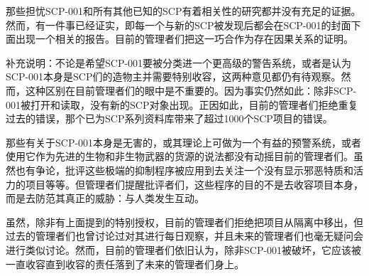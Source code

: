 那些担忧SCP-001和所有其他已知的SCP有着相关性的研究都并没有充足的证据。然而，有一件事已经证实，即每一个与新的SCP被发现后都会在SCP-001的封面下面出现一个相关的报告。目前的管理者们把这一巧合作为存在因果关系的证明。

补充说明：不论是希望SCP-001要被分类进一个更高级的警告系统，或者是认为SCP-001本身是SCP们的造物主并需要特别收容，这两种意见都仍有待观察。然而，这种区别在目前管理者们的眼中是不重要的。因为事实仍然如此：除非SCP-001被打开和读取，没有新的SCP对象出现。正因如此，目前的管理者们拒绝重复过去的错误，那个已为SCP系列资料库带来了超过1000个SCP项目的错误。

那些有关于SCP-001本身是无害的，或其理论上可做为一个有益的预警系统，或者使用它作为先进的生物和非生物武器的货源的说法都没有动摇目前的管理者们。虽然也有争论，批评这些极端的抑制程序被应用到去关注一个没有显示邪恶特质和活力的项目等等。但管理者们提醒批评者们，这些程序的目的不是去收容项目本身，而是去防范其真正的威胁：与人类发生互动。

虽然，除非有上面提到的特别授权，目前的管理者们拒绝把项目从隔离中移出，但过去的管理者们也曾讨论过对其进行每日观察，并且未来的管理者们也毫无疑问会进行类似讨论。然而，目前的管理者们依旧认为，除非SCP-001被破坏，它应该被一直收容直到收容的责任落到了未来的管理者们身上。
